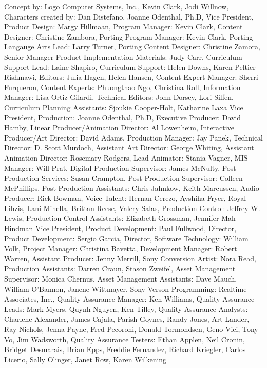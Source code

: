 Concept by: Logo Computer Systems, Inc., Kevin Clark, Jodi Willnow,
Characters created by: Dan Distefano, Joanne Odenthal, Ph.D,
Vice President, Product Design: Margy Hillmaan,
Program Manager: Kevin Clark,
Content Designer: Christine Zambora,
Porting Program Manager: Kevin Clark,
Porting Langauge Arts Lead: Larry Turner,
Porting Content Designer: Christine Zamora,
Senior Manager Product Implementation Materials: Judy Carr,
Curriculum Support Lead: Laine Shapiro,
Curriculum Support: Helen Downs, Karen Peltier-Rishmawi,
Editors: Julia Hagen, Helen Hansen,
Content Expert Manager: Sherri Furqueron,
Content Experts: Phuongthao Ngo, Christina Roll,
Information Manager: Lisa Ortiz-Gilardi,
Technical Editors: John Dorsey, Lori Silfen,
Curriculum Planning Assistants: Sjoukie Cooper-Holt, Katharine Laxa
Vice President, Production: Joanne Odenthal, Ph.D,
Executive Producer: David Hamby,
Linear Producer/Animation Director: Al Lowenheim,
Interactive Producer/Art Director: David Adams,
Production Manager: Jay Panek,
Technical Director: D. Scott Murdoch,
Assistant Art Director: George Whiting,
Assistant Animation Director: Rosemary Rodgers,
Lead Animator: Stania Vagner,
MIS Manager: Will Prat,
Digital Production Supervisor: James McNulty,
Post Production Services: Susan Crampton,
Post Production Supervisor: Colleen McPhillips,
Post Production Assistants: Chris Jahnkow, Keith Marcussen,
Audio Producer: Rick Bowman,
Voice Talent: Hernan Cerezo, Ayshiha Fryer, Royal Lihzis, Lani Minella, Brittan Reese, Valery Salas,
Production Control: Jeffrey W. Lewis,
Production Control Assistants: Elizabeth Grossman, Jennifer Mah Hindman
Vice President, Product Development: Paul Fullwood,
Director, Product Development: Sergio Garcia,
Director, Software Technology: William Volk,
Project Manager: Christina Bavetta,
Development Manager: Robert Warren,
Assistant Producer: Jenny Merrill,
Sony Conversion Artist: Nora Read,
Production Assistants: Darren Craun, Stason Zweifel,
Asset Management Supervisor: Monica Chernus,
Asset Management Assistants: Dave Mauch, William O'Bannon, Janene Wittmayer,
Sony Verson Programming: Realtime Associates, Inc.,
Quality Assurance Manager: Ken Williams,
Quality Assurance Leads: Mark Myers, Quynh Nguyen, Ken Tilley,
Quality Assurance Analysts: Charlene Alexander, James Cajala, Parish Goynes, Randy Jones, Art Lander, Ray Nichols, Jenna Payne, Fred Pecoroni, Donald Tormondsen, Geno Vici, Tony Vo, Jim Wadsworth,
Quality Assurance Testers: Ethan Applen, Neil Cronin, Bridget Desmarais, Brian Epps, Freddie Fernandez, Richard Kriegler, Carlos Licerio, Sally Olinger, Janet Row, Karen Wilkening


